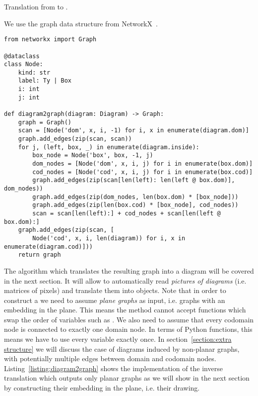 \begin{python}\label{listing:diagram2graph}
{\normalfont Translation from  to .}

We use the graph data structure from NetworkX~\cite{HagbergEtAl08}.

\begin{verbatim}
from networkx import Graph

@dataclass
class Node:
    kind: str
    label: Ty | Box
    i: int
    j: int

def diagram2graph(diagram: Diagram) -> Graph:
    graph = Graph()
    scan = [Node('dom', x, i, -1) for i, x in enumerate(diagram.dom)]
    graph.add_edges(zip(scan, scan))
    for j, (left, box, _) in enumerate(diagram.inside):
        box_node = Node('box', box, -1, j)
        dom_nodes = [Node('dom', x, i, j) for i in enumerate(box.dom)]
        cod_nodes = [Node('cod', x, i, j) for i in enumerate(box.cod)]
        graph.add_edges(zip(scan[len(left): len(left @ box.dom)], dom_nodes))
        graph.add_edges(zip(dom_nodes, len(box.dom) * [box_node]))
        graph.add_edges(zip(len(box.cod) * [box_node], cod_nodes))
        scan = scan[len(left):] + cod_nodes + scan[len(left @ box.dom):]
    graph.add_edges(zip(scan, [
        Node('cod', x, i, len(diagram)) for i, x in enumerate(diagram.cod)]))
    return graph
\end{verbatim}
\end{python}

The  algorithm which translates the resulting graph into a diagram will be covered in the next section.
It will allow to automatically read \emph{pictures of diagrams} (i.e. matrices of pixels) and translate them into  objects.
Note that in order to construct a  we need to assume \emph{plane graphs} as input, i.e. graphs with an embedding in the plane.
This means the  method cannot accept functions which swap the order of variables such as .
We also need to assume that every codomain node is connected to exactly one domain node.
In terms of Python functions, this means we have to use every variable exactly once.
In section~\ref{section:extra structure} we will discuss the case of diagrams induced by non-planar graphs, with potentially multiple edges between domain and codomain nodes.
Listing~\ref{listing:diagram2graph} shows the implementation of the inverse translation  which outputs only planar graphs as we will show in the next section by constructing their embedding in the plane, i.e. their drawing.
